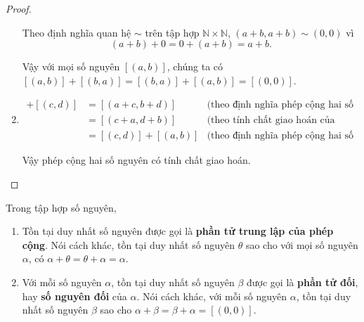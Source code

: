 \begin{proof}
\begin{enumerate}[label={(\roman*)}]
              Theo định nghĩa quan hệ $\sim$ trên tập hợp $\mathbb{N}\times\mathbb{N}$, $(a+b, a+b)\sim (0, 0)$ vì
              \[
                  (a+b) + 0 = 0 + (a+b) = a+b.
              \]

              Vậy với mọi số nguyên $[(a, b)]$, chúng ta có $[(a, b)] + [(b, a)] = [(b, a)] + [(a, b)] = [(0, 0)]$.
        \item \begin{align*}
                  [(a, b)] + [(c, d)] & = [(a+c, b+d)]        & \text{(theo định nghĩa phép cộng hai số nguyên)}            \\
                                      & = [(c+a, d+b)]        & \text{(theo tính chất giao hoán của phép cộng số tự nhiên)} \\
                                      & = [(c, d)] + [(a, b)] & \text{(theo định nghĩa phép cộng hai số nguyên)}
              \end{align*}

              Vậy phép cộng hai số nguyên có tính chất giao hoán.
    \end{enumerate}
\end{proof}

\begin{theorem}\label{theorem:uniqueness-of-additive-identity-and-additive-inverse}
    Trong tập hợp số nguyên,
    \begin{enumerate}[label={(\roman*)}]
        \item Tồn tại duy nhất số nguyên được gọi là \textbf{phần tử trung lập của phép cộng}. Nói cách khác, tồn tại duy nhất số nguyên $\theta$ sao cho với mọi số nguyên $\alpha$, có $\alpha + \theta = \theta + \alpha = \alpha$.
        \item Với mỗi số nguyên $\alpha$, tồn tại duy nhất số nguyên $\beta$ được gọi là \textbf{phần tử đối}, hay \textbf{số nguyên đối} của $\alpha$. Nói cách khác, với mỗi số nguyên $\alpha$, tồn tại duy nhất số nguyên $\beta$ sao cho $\alpha + \beta = \beta + \alpha = [(0,0)]$.
    \end{enumerate}
\end{theorem}

